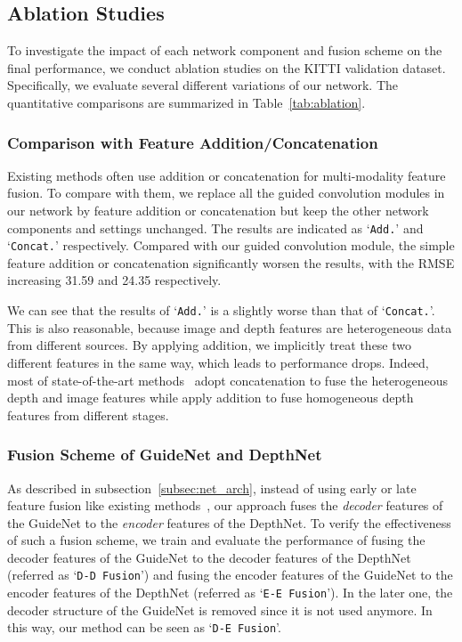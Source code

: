 \documentclass[journal]{IEEEtran}
\begin{document}
\subsection{Ablation Studies}
\label{subsec:ablation_studies}
To investigate the impact of each network component and fusion scheme on the final performance, we conduct ablation studies on the KITTI validation dataset.
Specifically, we evaluate several different variations of our network.
The quantitative comparisons are summarized in Table~\ref{tab:ablation}.

\subsubsection{Comparison with Feature Addition/Concatenation}
Existing methods often use addition or concatenation for multi-modality feature fusion.
To compare with them, we replace all the guided convolution modules in our network by feature addition or concatenation but keep the other network components and settings unchanged.
The results are indicated as `\texttt{Add.}' and `\texttt{Concat.}' respectively.
Compared with our guided convolution module, the simple feature addition or concatenation significantly worsen the results,
with the RMSE increasing 31.59  and 24.35  respectively. 

We can see that the results of `\texttt{Add.}' is a slightly worse than that of `\texttt{Concat.}'.
This is also reasonable, because image and depth features are heterogeneous data from different sources. 
By applying addition, we implicitly treat these two different features in the same way, which leads to performance drops.
Indeed, most of state-of-the-art methods~\cite{deep_lidar,self_supervised,cnn_confidence} adopt concatenation to
fuse the heterogeneous depth and image features while apply addition to fuse homogeneous depth features from different stages.


\subsubsection{Fusion Scheme of GuideNet and DepthNet}
As described in subsection~\ref{subsec:net_arch}, instead of using early or late feature fusion like existing methods~\cite{deep_lidar, sparse_noisy, self_supervised},
our approach fuses the \emph{decoder} features of the GuideNet to the \emph{encoder} features of the DepthNet.
To verify the effectiveness of such a fusion scheme,
we train and evaluate the performance of fusing the decoder features of the GuideNet to the decoder features of the DepthNet (referred as `\texttt{D-D Fusion}')
and fusing the encoder features of the GuideNet to the encoder features of the DepthNet (referred as `\texttt{E-E Fusion}').
In the later one, the decoder structure of the GuideNet is removed since it is not used anymore.
In this way, our method can be seen as `\texttt{D-E Fusion}'.
\end{document}
